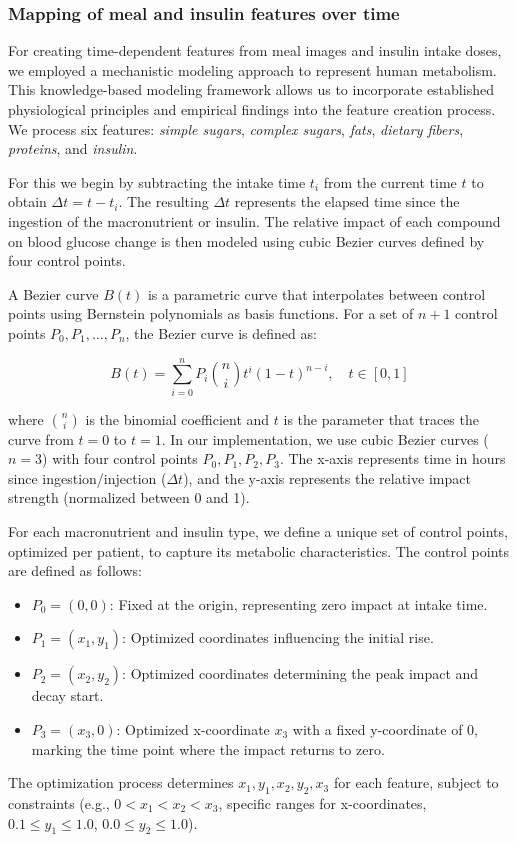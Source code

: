 \subsubsection{Mapping of meal and insulin features over time}

For creating time-dependent features from meal images and insulin intake doses, we employed a mechanistic modeling approach to represent human metabolism. This knowledge-based modeling framework allows us to incorporate established physiological principles and empirical findings into the feature creation process. We process six features: \textit{simple sugars}, \textit{complex sugars}, \textit{fats}, \textit{dietary fibers}, \textit{proteins}, and \textit{insulin}.

For this we begin by subtracting the intake time \( t_i \) from the current time \( t \) to obtain \( \Delta t = t - t_i \). The resulting \( \Delta t \) represents the elapsed time since the ingestion of the macronutrient or insulin. The relative impact of each compound on blood glucose change is then modeled using cubic Bezier curves defined by four control points.

A Bezier curve \( B(t) \) is a parametric curve that interpolates between control points using Bernstein polynomials as basis functions. For a set of \( n+1 \) control points \( P_0, P_1, \ldots, P_n \), the Bezier curve is defined as:

\begin{equation}
B(t) = \sum_{i=0}^{n} P_i \binom{n}{i} t^i (1-t)^{n-i}, \quad t \in [0,1]
\end{equation}

where \( \binom{n}{i} \) is the binomial coefficient and \( t \) is the parameter that traces the curve from \( t=0 \) to \( t=1 \). In our implementation, we use cubic Bezier curves (\( n=3 \)) with four control points \( P_0, P_1, P_2, P_3 \). The x-axis represents time in hours since ingestion/injection (\(\Delta t\)), and the y-axis represents the relative impact strength (normalized between 0 and 1).

For each macronutrient and insulin type, we define a unique set of control points, optimized per patient, to capture its metabolic characteristics. The control points are defined as follows:
\begin{itemize}
    \item \( P_0 = (0,0) \): Fixed at the origin, representing zero impact at intake time.
    \item \( P_1 = (x_1, y_1) \): Optimized coordinates influencing the initial rise.
    \item \( P_2 = (x_2, y_2) \): Optimized coordinates determining the peak impact and decay start.
    \item \( P_3 = (x_3, 0) \): Optimized x-coordinate \(x_3\) with a fixed y-coordinate of 0, marking the time point where the impact returns to zero.
\end{itemize}
The optimization process determines \(x_1, y_1, x_2, y_2, x_3\) for each feature, subject to constraints (e.g., \(0 < x_1 < x_2 < x_3\), specific ranges for x-coordinates, \(0.1 \le y_1 \le 1.0\), \(0.0 \le y_2 \le 1.0\)).

